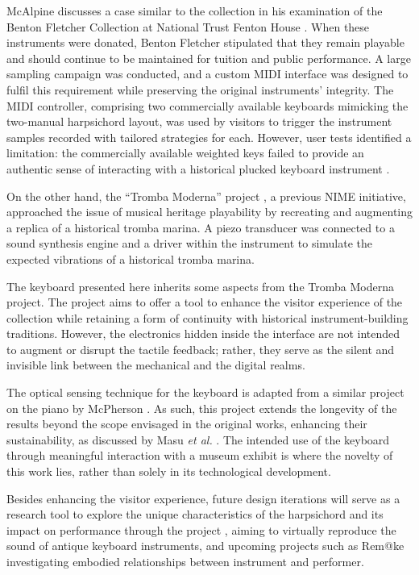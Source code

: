 McAlpine discusses a case similar to the  collection in his examination of the Benton Fletcher Collection at National Trust Fenton House \cite{McAlpine2014}. When these instruments were donated, Benton Fletcher stipulated that they remain playable and should continue to be maintained for tuition and public performance. A large sampling campaign was conducted, and a custom MIDI interface was designed to fulfil this requirement while preserving the original instruments' integrity. The MIDI controller, comprising two commercially available keyboards mimicking the two-manual harpsichord layout, was used by visitors to trigger the instrument samples recorded with tailored strategies for each. However, user tests identified a limitation: the commercially available weighted keys failed to provide an authentic sense of interacting with a historical plucked keyboard instrument \cite{McAlpine2014}. 

On the other hand, the ``Tromba Moderna'' project \cite{Baldwin2016}, a previous NIME initiative, approached the issue of musical heritage playability by recreating and augmenting a replica of a historical tromba marina. A piezo transducer was connected to a sound synthesis engine and a driver within the instrument to simulate the expected vibrations of a historical tromba marina. 


The keyboard presented here inherits some aspects from the Tromba Moderna project. The project aims to offer a tool to enhance the visitor experience of the  collection while retaining a form of continuity with historical instrument-building traditions. However, the electronics hidden inside the interface are not intended to augment or disrupt the tactile feedback; rather, they serve as the silent and invisible link between the mechanical and the digital realms. 



The optical sensing technique for the keyboard is adapted from a similar project on the piano by McPherson \cite{McPherson2013}. As such, this project extends the longevity of the results beyond the scope envisaged in the original works, enhancing their sustainability, as discussed by Masu \emph{et al.} \cite{Masu_NIME_2023}. The intended use of the keyboard through meaningful interaction with a museum exhibit is where the novelty of this work lies, rather than solely in its technological development. 




Besides enhancing the visitor experience, future design iterations will serve as a research tool to explore the unique characteristics of the harpsichord and its impact on performance through the  project , aiming to virtually reproduce the sound of antique keyboard instruments, and upcoming projects such as Rem@ke \cite{remake1} investigating embodied relationships between instrument and performer.


